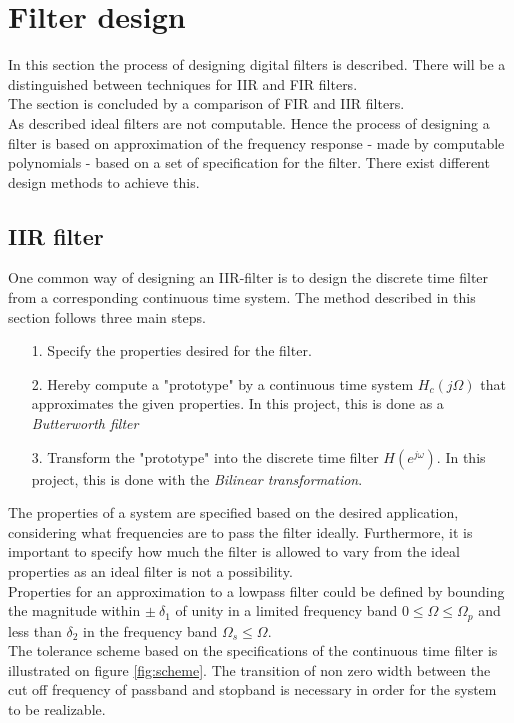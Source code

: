 \section{Filter design}
In this section the process of designing digital filters is described. There will be a distinguished between techniques for IIR and FIR filters.\\ The section is concluded by a comparison of FIR and IIR filters.\\  
As described ideal filters are not computable. Hence the process of designing a filter is based on approximation of the frequency response - made by computable polynomials - based on a set of specification for the filter. There exist different design methods to achieve this.   
\subsection{IIR filter}
One common way of designing an IIR-filter is to design the discrete time filter from a corresponding continuous time system. The method described in this section follows three main steps. 
\begin{itemize}
\item[1.] Specify the properties desired for the filter.
\item[2.] Hereby compute a "prototype" by a continuous time system $H_c(j\Omega)$ that approximates the given properties. In this project, this is done as a \textit{Butterworth filter}  
\item[3.] Transform the "prototype" into the discrete time filter $H(e^{j\omega})$. In this project, this is done with the \textit{Bilinear transformation}. 
\end{itemize}
The properties of a system are specified based on the desired application, considering what frequencies are to pass the filter ideally. Furthermore, it is important to specify how much the filter is allowed to vary from the ideal properties as an ideal filter is not a possibility. \\
Properties for an approximation to a lowpass filter could be defined by bounding the magnitude within $\pm \ \delta_1$ of unity in a limited frequency band $0 \leq \Omega \leq \Omega_p $ and less than $\delta_2$ in the frequency band $\Omega_s \leq \Omega$. \\
The tolerance scheme based on the specifications of the continuous time filter is illustrated on figure \ref{fig:scheme}.
The transition of non zero width between the cut off frequency of passband and stopband is necessary in order for the system to be realizable.

